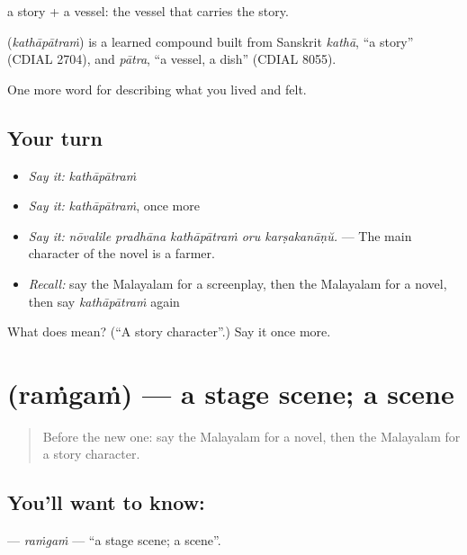  a story +  a vessel: the vessel that carries the story.

\begin{cousinweb}
\textbf{} (\emph{kathāpātraṁ}) is a learned compound built from Sanskrit \emph{kathā}, \textquotedblleft{}a story\textquotedblright{} (CDIAL 2704), and \emph{pātra}, \textquotedblleft{}a vessel, a dish\textquotedblright{} (CDIAL 8055).
\end{cousinweb}

\begin{grammarlens}[title={What you've built}]
One more word for describing what you lived and felt.
\end{grammarlens}

\subsection*{Your turn}
\begin{itemize}
\raggedright
  \item \emph{Say it:} \emph{kathāpātraṁ}
  \item \emph{Say it:} \emph{kathāpātraṁ}, once more
  \item \emph{Say it:} \emph{nōvalile pradhāna kathāpātraṁ oru karṣakanāṇŭ.} — The main character of the novel is a farmer.
  \item \emph{Recall:} say the Malayalam for a screenplay, then the Malayalam for a novel, then say \emph{kathāpātraṁ} again
\end{itemize}

\begin{tcolorbox}[breakable,colback=teal!4,colframe=teal!35!black,title={Before you move on}]
What does  mean? (\textquotedblleft{}A story character\textquotedblright{}.) Say it once more.
\end{tcolorbox}
\section[\texorpdfstring{\ml{രംഗം} (raṁgaṁ)}{രംഗം (raṁgaṁ)}]{ (raṁgaṁ) — a stage scene; a scene}

\label{lesson:ML-C563-ramgam}



\begin{quote}
Before the new one: say the Malayalam for a novel, then the Malayalam for a story character.
\end{quote}

\subsection*{You'll want to know: }
\textbf{} — \emph{raṁgaṁ} — \textquotedblleft{}a stage scene; a scene\textquotedblright{}.

